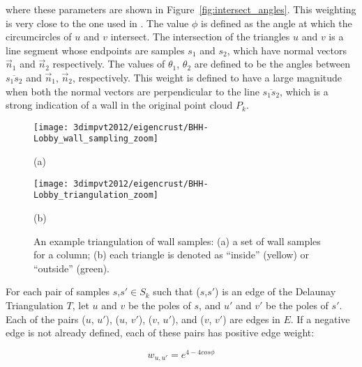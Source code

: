 \documentclass[12pt,onecolumn,oneside]{book}
\begin{document}
where these parameters are shown in Figure~\ref{fig:intersect_angles}.  This weighting is very close to the one used in \cite{EigencrustShewchuk}.  The value $\phi$ is defined as the angle at which the circumcircles of $u$ and $v$ intersect.  The intersection of the triangles $u$ and $v$ is a line segment whose endpoints are samples $s_1$ and $s_2$, which have normal vectors $\vec{n}_1$ and $\vec{n}_2$ respectively.  The values of $\theta_1$, $\theta_2$ are defined to be the angles between $\overline{s_1 s_2}$ and $\vec{n}_1$, $\vec{n}_2$, respectively.  This weight is defined to have a large magnitude when both the normal vectors are perpendicular to the line $\overline{s_1 s_2}$, which is a strong indication of a wall in the original point cloud $P_k$.

\begin{figure}[t]

\begin{minipage}[b]{0.5\linewidth}
  \centering
  \centerline{\texttt{[image: 3dimpvt2012/eigencrust/BHH-Lobby\_wall\_sampling\_zoom]}}
  \centerline{(a)}
\end{minipage}
\hfill
\begin{minipage}[b]{0.5\linewidth}
  \centering
  \centerline{\texttt{[image: 3dimpvt2012/eigencrust/BHH-Lobby\_triangulation\_zoom]}}
  \centerline{(b)}
\end{minipage}

\caption[Example triangulation of wall samples.]{An example triangulation of wall samples: (a) a set of wall samples for a column; (b) each triangle is denoted as ``inside'' (yellow) or ``outside'' (green).}
\label{fig:eigencrust_triangulation}

\end{figure}

For each pair of samples $s$,$s' \in S_k$ such that ($s$,$s'$) is an edge of the Delaunay Triangulation $T$, let $u$ and $v$ be the poles of $s$, and $u'$ and $v'$ be the poles of $s'$.  Each of the pairs ($u$, $u'$), ($u$, $v'$), ($v$, $u'$), and ($v$, $v'$) are edges in $E$.  If a negative edge is not already defined, each of these pairs has positive edge weight:

\begin{equation}
w_{u,u'} = e ^ {4 - 4 cos \phi}
\label{pos_edge_weight}
\end{equation}
\end{document}
